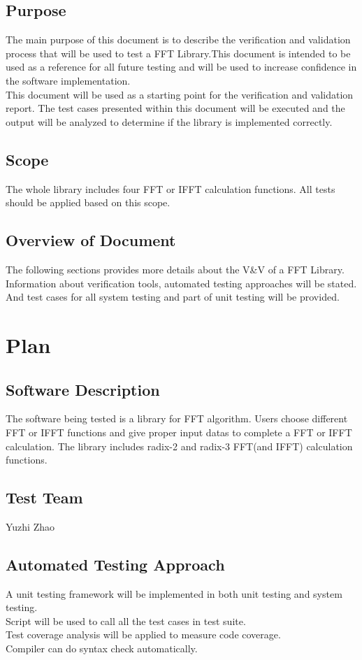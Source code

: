 \documentclass[12pt, titlepage]{article}
\begin{document}
\subsection{Purpose}
The main purpose of this document is to describe the verification and validation process
that will be used to test a FFT Library.This document is intended to be used as a reference for all future testing and will be used
to increase confidence in the software implementation.\\
This document will be used as a starting point for the verification and validation report.
The test cases presented within this document will be executed and the output will be
analyzed to determine if the library is implemented correctly.

\subsection{Scope}
The whole library includes four FFT or IFFT calculation functions. All tests should be applied based on this scope.

\subsection{Overview of Document}
The following sections provides more details about the V\&V of a FFT Library. Information about verification tools, automated testing approaches will be stated. And
test cases for all system testing and part of unit testing will be provided.
\section{Plan}
	
\subsection{Software Description}
The software being tested is a library for FFT algorithm. Users choose different  FFT or IFFT functions and give proper input datas to complete a FFT or IFFT calculation. 
The library includes radix-2 and radix-3 FFT(and IFFT) calculation functions.
\subsection{Test Team}
Yuzhi Zhao

\subsection{Automated Testing Approach}
A unit testing framework will be implemented in both unit testing and system testing.\\
Script will be used to call all the test cases in test suite.\\
Test coverage analysis will be applied to measure code coverage.\\
Compiler can do syntax check automatically.
\end{document}
